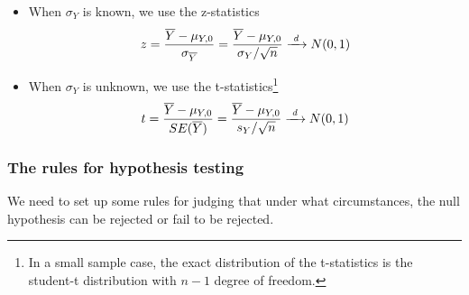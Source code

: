 \documentclass[a4paper,11pt]{article}
\begin{document}
\begin{itemize}
\item When \(\sigma_Y\) is known, we use the z-statistics
\[ z = \frac{\overline{Y} -
  \mu_{Y,0}}{\sigma_{\overline{Y}}} = \frac{\overline{Y} -
  \mu_{Y,0}}{\sigma_Y/\sqrt{n}} \xrightarrow{\text{ \textit d }} N(0, 1)\]

\item When \(\sigma_Y\) is unknown, we use the t-statistics\footnote{In a small
sample case, the exact distribution of the t-statistics is the
student-t distribution with \(n-1\) degree of freedom.}
\[ t = \frac{\overline{Y} - \mu_{Y,0}}{SE(\overline{Y})} =
  \frac{\overline{Y} - \mu_{Y,0}}{s_Y/\sqrt{n}} \xrightarrow{ \text{
  \textit d } } N(0, 1) \]
\end{itemize}

\subsubsection*{The rules for hypothesis testing}
\label{sec:orgb3841a1}
We need to set up some rules for judging that under what
circumstances, the null hypothesis can be rejected or fail
to be rejected. 
\end{document}
